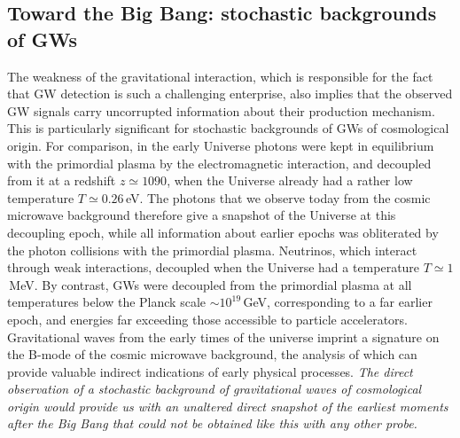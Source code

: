 \subsection{Toward the Big Bang: stochastic backgrounds of GWs}


The weakness of the gravitational interaction, which is responsible for the fact that  GW detection is such a challenging enterprise, 
also implies that the observed GW signals  carry uncorrupted information about their production mechanism. This is particularly significant for stochastic backgrounds of GWs of cosmological origin. For comparison, in the early Universe photons were kept in equilibrium with the primordial plasma by the electromagnetic interaction, and decoupled from it  at a redshift $z\simeq 1090$, when the Universe already had a rather low temperature $T\simeq 0.26$\,eV. The photons that we observe today from the cosmic microwave background  therefore give a snapshot of the Universe at this decoupling epoch, while all information about earlier epochs was obliterated by the photon collisions with the primordial plasma. Neutrinos, which interact through weak interactions, decoupled  when the Universe had a temperature $T\simeq 1$\,MeV.  By contrast, GWs were decoupled from the primordial plasma at all temperatures below the Planck scale $\sim 10^{19}$\,GeV,
corresponding to a far earlier epoch, and energies far exceeding  those accessible to particle accelerators. Gravitational waves from the early times of the universe imprint a signature on the B-mode of the cosmic microwave background, the analysis of which can provide valuable indirect indications of early physical processes. \emph{The direct observation of a stochastic background of gravitational waves of cosmological origin would provide us with an unaltered direct snapshot of the earliest moments after the Big Bang that could not be obtained like this with any other probe.} 

